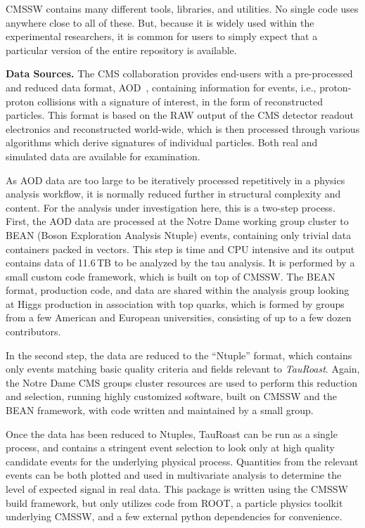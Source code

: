 \documentclass[procedia]{easychair}
\begin{document}
CMSSW contains many different tools, libraries, and utilities.  No single code uses anywhere close to all of these.  But, because it is widely used within the experimental researchers, it is common for users to simply expect that a particular version of the entire repository is available.
 
{\bf Data Sources.}
The CMS collaboration provides end-users with a pre-processed
and reduced data format, AOD~\cite{holtman2001cms}, containing information for events, i.e.,
proton-proton collisions with a signature of interest, in the form of
reconstructed particles.  This format is based on the RAW output of
the CMS detector readout electronics and reconstructed world-wide, which is then processed through various algorithms which derive signatures of individual particles.
Both real and simulated data are available for examination.

As AOD data are too large to be iteratively processed repetitively in
a physics analysis workflow, it is normally reduced further in
structural complexity and content.  For the analysis under
investigation here, this is a two-step process.  First, the AOD data
are processed at the Notre Dame working group cluster to BEAN (Boson Exploration Analysis Ntuple) events,
containing only trivial data containers packed in vectors.  This step
is time and CPU intensive and its output contains data of 11.6$\,$TB to be
analyzed by the tau analysis.
It is performed by a small custom code framework, which is built on top of CMSSW.
The BEAN format, production code, and
data are shared within the analysis group looking at Higgs production
in association with top quarks, which is formed by groups from a few
American and European universities,
consisting of up to a few dozen contributors.

In the second step, the data are reduced to the ``Ntuple'' format,
which contains only events matching basic quality criteria and
fields relevant to \emph{TauRoast}.
Again, the Notre Dame CMS groups cluster
resources are used to perform this reduction and selection,
running highly customized software,
built on CMSSW and the BEAN framework,
with code written and maintained by a small group.

Once the data has been reduced to Ntuples, TauRoast can be run as a single
process, and contains a stringent event selection to look only at high
quality candidate events for the underlying physical process.
Quantities from the relevant events can be
both plotted and used in multivariate analysis to determine the level
of expected signal in real data.
This package is written using the CMSSW build framework,
but only utilizes code from ROOT,
a particle physics toolkit underlying CMSSW,
and a few external python dependencies for convenience.
\end{document}
